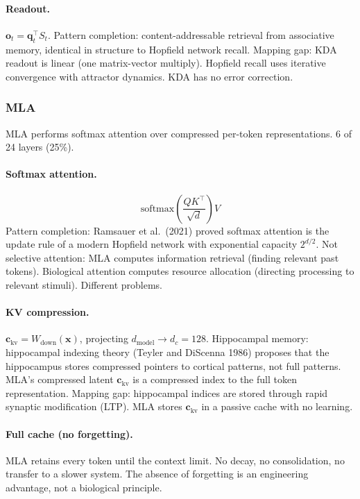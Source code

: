 \documentclass[11pt,a4paper]{article}
\begin{document}
\paragraph{Readout.}
$\mathbf{o}_t = \mathbf{q}_t^\top S_t$. Pattern completion: content-addressable retrieval from associative memory, identical in structure to Hopfield network recall. Mapping gap: KDA readout is linear (one matrix-vector multiply). Hopfield recall uses iterative convergence with attractor dynamics. KDA has no error correction.

\subsubsection{MLA}

MLA performs softmax attention over compressed per-token representations. 6 of 24 layers (25\%).

\paragraph{Softmax attention.}
\[
  \mathrm{softmax}\!\left(\frac{QK^\top}{\sqrt{d}}\right) V
\]
Pattern completion: Ramsauer et al.\ (2021) proved softmax attention is the update rule of a modern Hopfield network with exponential capacity $2^{d/2}$. Not selective attention: MLA computes information retrieval (finding relevant past tokens). Biological attention computes resource allocation (directing processing to relevant stimuli). Different problems.

\paragraph{KV compression.}
$\mathbf{c}_{\mathrm{kv}} = W_{\mathrm{down}}(\mathbf{x})$, projecting $d_{\mathrm{model}} \to d_c = 128$. Hippocampal memory: hippocampal indexing theory (Teyler and DiScenna 1986) proposes that the hippocampus stores compressed pointers to cortical patterns, not full patterns. MLA's compressed latent $\mathbf{c}_{\mathrm{kv}}$ is a compressed index to the full token representation. Mapping gap: hippocampal indices are stored through rapid synaptic modification (LTP). MLA stores $\mathbf{c}_{\mathrm{kv}}$ in a passive cache with no learning.

\paragraph{Full cache (no forgetting).}
MLA retains every token until the context limit. No decay, no consolidation, no transfer to a slower system. The absence of forgetting is an engineering advantage, not a biological principle.
\end{document}

